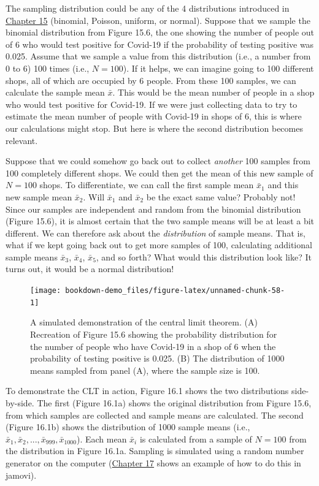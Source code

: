 \documentclass[
  openany]{krantz}
\begin{document}
The sampling distribution could be any of the 4 distributions introduced in \protect\hyperlink{Chapter_15}{Chapter 15} (binomial, Poisson, uniform, or normal).
Suppose that we sample the binomial distribution from Figure 15.6, the one showing the number of people out of 6 who would test positive for Covid-19 if the probability of testing positive was 0.025.
Assume that we sample a value from this distribution (i.e., a number from 0 to 6) 100 times (i.e., \(N = 100\)).
If it helps, we can imagine going to 100 different shops, all of which are occupied by 6 people.
From these 100 samples, we can calculate the sample mean \(\bar{x}\).
This would be the mean number of people in a shop who would test positive for Covid-19.
If we were just collecting data to try to estimate the mean number of people with Covid-19 in shops of 6, this is where our calculations might stop.
But here is where the second distribution becomes relevant.

Suppose that we could somehow go back out to collect \emph{another} 100 samples from 100 completely different shops.
We could then get the mean of this new sample of \(N = 100\) shops.
To differentiate, we can call the first sample mean \(\bar{x}_{1}\) and this new sample mean \(\bar{x}_{2}\).
Will \(\bar{x}_{1}\) and \(\bar{x}_{2}\) be the exact same value?
Probably not!
Since our samples are independent and random from the binomial distribution (Figure 15.6), it is almost certain that the two sample means will be at least a bit different.
We can therefore ask about the \emph{distribution} of sample means.
That is, what if we kept going back out to get more samples of 100, calculating additional sample means \(\bar{x}_{3}\), \(\bar{x}_{4}\), \(\bar{x}_{5}\), and so forth?
What would this distribution look like?
It turns out, it would be a normal distribution!

\begin{figure}
\texttt{[image: bookdown-demo\_files/figure-latex/unnamed-chunk-58-1]} \caption{A simulated demonstration of the central limit theorem. (A) Recreation of Figure 15.6 showing the probability distribution for the number of people who have Covid-19 in a shop of 6 when the probability of testing positive is 0.025. (B) The distribution of 1000 means sampled from panel (A), where the sample size is 100.}\label{fig:unnamed-chunk-58}
\end{figure}

To demonstrate the CLT in action, Figure 16.1 shows the two distributions side-by-side.
The first (Figure 16.1a) shows the original distribution from Figure 15.6, from which samples are collected and sample means are calculated.
The second (Figure 16.1b) shows the distribution of 1000 sample means (i.e., \(\bar{x}_{1}, \bar{x}_{2}, ..., \bar{x}_{999}, \bar{x}_{1000}\)).
Each mean \(\bar{x}_{i}\) is calculated from a sample of \(N = 100\) from the distribution in Figure 16.1a.
Sampling is simulated using a random number generator on the computer (\protect\hyperlink{Chapter_17}{Chapter 17} shows an example of how to do this in jamovi).
\end{document}
